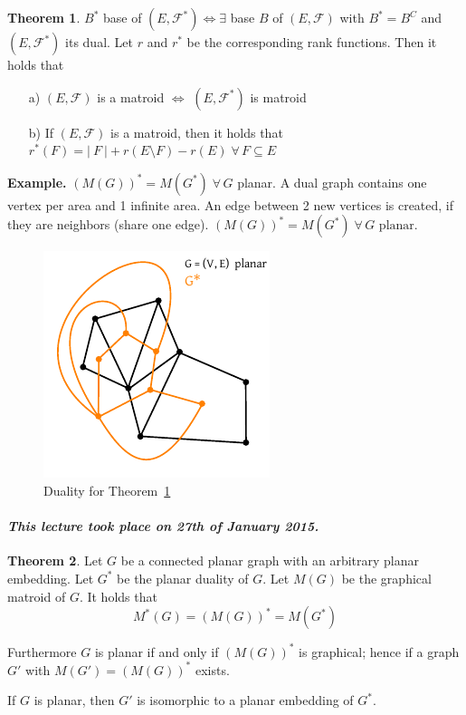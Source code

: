 \documentclass[a4paper]{article}
\theoremstyle{definition}
\newtheorem{theorem}{Theorem}
\newcommand{\card}[1]{\left|\:\!#1\:\!\right|}
\newcommand{\dateref}[1]{\paragraph{\textit{This lecture took place on #1.}}}
\newcommand{\fall}{\;\forall\,}
\begin{document}
\begin{theorem}
  \label{corollary-8.10}
  \label{satz-8.10}
  $B^*$ base of $(E, \mathcal{F}^*) \Leftrightarrow \exists$ base $B$ of $(E, \mathcal{F})$ with $B^* = B^C$ and $(E, \mathcal{F}^*)$ its dual. Let $r$ and $r^*$ be the corresponding rank functions.
  Then it holds that
  \begin{itemize}
    \item[a)] $(E, \mathcal{F})$ is a matroid $\Leftrightarrow$ $(E, \mathcal{F}^*)$ is matroid
    \item[b)] If $(E, \mathcal{F})$ is a matroid, then it holds that $r^*(F) = \card{F} + r(E \setminus F) - r(E) \fall F \subseteq E$
  \end{itemize}
\end{theorem}

\textbf{Example.}
  $(M(G))^* = M(G^*) \fall G$ planar. A dual graph contains one vertex per area and 1 infinite area. An edge between 2 new vertices is created, if they are neighbors (share one edge). $(M(G))^* = M(G^*) \fall G \text{ planar}$.
  \begin{figure}[!ht]
    \begin{center}
      \includegraphics{img/duality.pdf}
      \caption{Duality for Theorem~\ref{corollary-8.10}}
    \end{center}
  \end{figure}


\dateref{27th of January 2015}

\begin{theorem}
  \label{satz-8.11}
  Let $G$ be a connected planar graph with an arbitrary planar embedding.
  Let $G^*$ be the planar duality of $G$. Let $M(G)$ be the graphical matroid of $G$.
  It holds that
    \[ M^*(G) = (M(G))^* = M(G^*) \]

  Furthermore $G$ is planar if and only if $(M(G))^*$ is graphical;
  hence if a graph $G'$ with $M(G') = (M(G))^*$ exists.

  If $G$ is planar, then $G'$ is isomorphic to a planar embedding of $G^*$.
\end{theorem}
\end{document}
